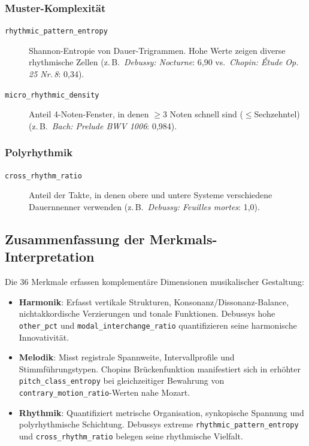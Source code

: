 \documentclass[12pt,a4paper]{article}
\theoremstyle{definition}
\begin{document}
\subsubsection*{Muster-Komplexität}
\begin{description}
    \item[\texttt{rhythmic\_pattern\_entropy}] Shannon-Entropie von Dauer-Trigrammen. Hohe Werte zeigen diverse rhythmische Zellen (z.\,B.\ \emph{Debussy: Nocturne}: 6{,}90 vs.\ \emph{Chopin: Étude Op.\,25 Nr.\,8}: 0{,}34).
    
    \item[\texttt{micro\_rhythmic\_density}] Anteil 4-Noten-Fenster, in denen $\geq$3 Noten schnell sind ($\leq$Sechzehntel) (z.\,B.\ \emph{Bach: Prelude BWV 1006}: 0{,}984).
\end{description}

\subsubsection*{Polyrhythmik}
\begin{description}
    \item[\texttt{cross\_rhythm\_ratio}] Anteil der Takte, in denen obere und untere Systeme verschiedene Dauernnenner verwenden (z.\,B.\ \emph{Debussy: Feuilles mortes}: 1{,}0).
\end{description}

\subsection{Zusammenfassung der Merkmals-Interpretation}

Die 36 Merkmale erfassen komplementäre Dimensionen musikalischer Gestaltung:
\begin{itemize}
    \item \textbf{Harmonik}: Erfasst vertikale Strukturen, Konsonanz/Dissonanz-Balance, nichtakkordische Verzierungen und tonale Funktionen. Debussys hohe \texttt{other\_pct} und \texttt{modal\_interchange\_ratio} quantifizieren seine harmonische Innovativität.
    
    \item \textbf{Melodik}: Misst registrale Spannweite, Intervallprofile und Stimmführungstypen. Chopins Brückenfunktion manifestiert sich in erhöhter \texttt{pitch\_class\_entropy} bei gleichzeitiger Bewahrung von \texttt{contrary\_motion\_ratio}-Werten nahe Mozart.
    
    \item \textbf{Rhythmik}: Quantifiziert metrische Organisation, synkopische Spannung und polyrhythmische Schichtung. Debussys extreme \texttt{rhythmic\_pattern\_entropy} und \texttt{cross\_rhythm\_ratio} belegen seine rhythmische Vielfalt.
\end{itemize}
\end{document}

